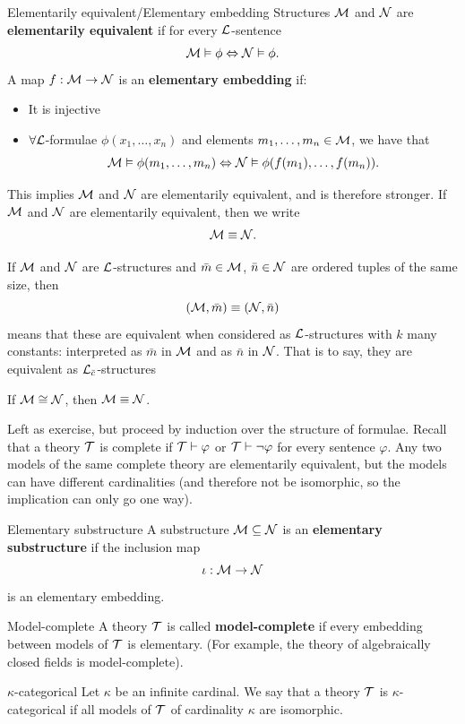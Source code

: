 \documentclass{article}
\numberwithin{thm}{subsection}
\begin{document}
\newlec
\begin{fancydefine}{Elementarily equivalent/Elementary embedding}
    Structures $\mathcal{M}$ and $\mathcal{N}$ are \textbf{elementarily equivalent} if for every $\mathcal{L}$-sentence
    \[ \mathcal{M} \vDash \phi \Leftrightarrow \mathcal{N} \vDash \phi. \]
    A map $f: \mathcal{M} \to \mathcal{N}$ is an \textbf{elementary embedding} if:
    \begin{itemize}
        \item It is injective
        \item $\forall \mathcal{L}$-formulae $\phi(x_{1}, \dots, x_{n})$ and elements $m_{1}, \dots, m_{n} \in \mathcal{M}$, we have that
        \[ \mathcal{M} \vDash \phi(m_{1}, \dots, m_{n}) \Leftrightarrow \mathcal{N} \vDash \phi(f(m_{1}), \dots, f(m_{n})).\]
    \end{itemize}
    This implies $\mathcal{M}$ and $\mathcal{N}$ are elementarily equivalent, and is therefore stronger.
    If $\mathcal{M}$ and $\mathcal{N}$ are elementarily equivalent, then we write \[ \mathcal{M} \equiv \mathcal{N}.\]
\end{fancydefine}
\remark If $\mathcal{M}$ and $\mathcal{N}$ are $\mathcal{L}$-structures and $\bar{m} \in \mathcal{M}$, $\bar{n} \in \mathcal{N}$ are ordered tuples of the same size, then \[
(\mathcal{M}, \bar{m}) \equiv (\mathcal{N}, \bar{n})\]
means that these are equivalent when considered as $\mathcal{L}$-structures with $k$ many constants: interpreted as $\bar{m}$ in $\mathcal{M}$ and as $\bar{n}$ in $\mathcal{N}$. That is to say, they are equivalent as $\mathcal{L}_{\bar{c}}$-structures
\begin{fancyprop}{} If $\mathcal{M} \cong \mathcal{N}$, then $\mathcal{M} \equiv \mathcal{N}$.\end{fancyprop}
\proof Left as exercise, but proceed by induction over the structure of formulae. \gap
Recall that a theory $\mathcal{T}$ is complete if $\mathcal{T} \vdash \varphi$ or $\mathcal{T} \vdash \neg \varphi$ for every sentence $\varphi$. Any two models of the same complete theory are elementarily equivalent, but the models can have different cardinalities (and therefore not be isomorphic, so the implication can only go one way).
\begin{fancydefine}{Elementary substructure} A substructure $\mathcal{M} \subseteq \mathcal{N}$ is an \textbf{elementary substructure} if the inclusion map \[
\iota : \mathcal{M} \to \mathcal{N} \]
is an elementary embedding.
\end{fancydefine}
\begin{fancydefine}{Model-complete} A theory $\mathcal{T}$ is called \textbf{model-complete} if every embedding between models of $\mathcal{T}$ is elementary. (For example, the theory of algebraically closed fields is model-complete).
\end{fancydefine}
\begin{fancydefine}{$\kappa$-categorical} Let $\kappa$ be an infinite cardinal. We say that a theory $\mathcal{T}$ is $\kappa$-categorical if all models of $\mathcal{T}$ of cardinality $\kappa$ are isomorphic.
\end{fancydefine}
    
\end{document}
